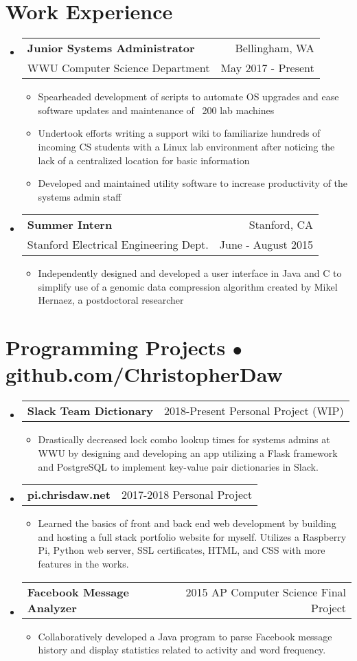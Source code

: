 \documentclass[12pt, letterpaper]{article}
\makeatletter
\newcommand{\resumeItem}[1]{
  \item[$\bullet$]{
    #1 \vspace{-2pt}
  }
}
\newcommand{\resumeSubsection}[4]{
  \item[]
    \begin{tabular*}{0.97\textwidth}{@{\extracolsep{\fill}} l r}
      \textbf{#1} & #2 \vspace{1pt} \\
      #3 & #4 \\
    \end{tabular*}
}
\newcommand{\resumeProject}[3]{
  \item[]
    \begin{tabular*}{0.97\textwidth}{@{\extracolsep{\fill}} l r}
      \textbf{#1} & #2 \\
    \end{tabular*}\vspace{-10pt}
    \begin{itemize}
        \item[] #3
    \end{itemize}
}
\makeatother
\begin{document}
\section{Work Experience}
  \begin{itemize}[leftmargin=*]
    \resumeSubsection
      {Junior Systems Administrator}{Bellingham, WA}
      {WWU Computer Science Department}{May 2017 - Present}
      \begin{itemize}
        \resumeItem{
          Spearheaded development of scripts to automate OS upgrades and ease software updates and maintenance of ~200 lab machines}
        \resumeItem{
            Undertook efforts writing a support wiki to familiarize hundreds of incoming CS students with a Linux lab environment after noticing the lack of a centralized location for basic information}
        \resumeItem{
            Developed and maintained utility software to increase productivity of the systems admin staff}
      \end{itemize}

    \resumeSubsection
      {Summer Intern}{Stanford, CA}
      {Stanford Electrical Engineering Dept.}{June - August 2015}
      \begin{itemize}
        \resumeItem{
            Independently designed and developed a user interface in Java and C to simplify use of a genomic data compression algorithm created by Mikel Hernaez, a postdoctoral researcher}
      \end{itemize}
    \end{itemize}

\vspace{-15pt}

\section{Programming Projects $\bullet$ github.com/ChristopherDaw}
  \begin{itemize}[leftmargin=*]
    \resumeProject
      {Slack Team Dictionary}{2018-Present Personal Project (WIP)}
      {Drastically decreased lock combo lookup times for systems admins at WWU by designing and developing an app utilizing a Flask framework and PostgreSQL to implement key-value pair  dictionaries in Slack.}
  \resumeProject
      {pi.chrisdaw.net}{2017-2018 Personal Project}
      {Learned the basics of front and back end web development by building and hosting a full stack portfolio website for myself. Utilizes a Raspberry Pi, Python web server, SSL certificates, HTML, and CSS with more features in the works.}
  \resumeProject
      {Facebook Message Analyzer}{2015 AP Computer Science Final Project}
      {Collaboratively developed a Java program to parse Facebook message history and display statistics related to activity and word frequency.}
  \end{itemize}%
\end{document}

